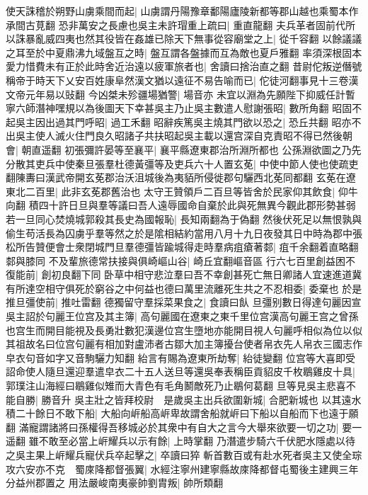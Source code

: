 使天誅稽於朔野山虜乘間而起|{
	山虜謂丹陽豫章鄱陽廬陵新都等郡山越也乘蜀本作承間古莧翻}
恐非萬安之長慮也吳主未許瑁重上疏曰|{
	重直龍翻}
夫兵革者固前代所以誅暴亂威四夷也然其役皆在姦雄已除天下無事從容廟堂之上|{
	從千容翻}
以餘議議之耳至於中夏鼎沸九域盤互之時|{
	盤互謂各盤據而互為敵也夏戶雅翻}
率須深根固本愛力惜費未有正於此時舍近治遠以疲軍旅者也|{
	舍讀曰捨治直之翻}
昔尉佗叛逆僭號稱帝于時天下乂安百姓康阜然漢文猶以遠征不易告喻而已|{
	佗徒河翻事見十三卷漢文帝元年易以䜴翻}
今凶桀未殄疆場猶警|{
	場音亦}
未宜以淵為先願陛下抑威任計暫寧六師潛神嘿規以為後圖天下幸甚吳主乃止吳主數遣人慰謝張昭|{
	數所角翻}
昭固不起吳主因出過其門呼昭|{
	過工禾翻}
昭辭疾篤吳主燒其門欲以恐之|{
	恐丘共翻}
昭亦不出吳主使人滅火住門良久昭諸子共扶昭起吳主載以還宫深自克責昭不得已然後朝會|{
	朝直遥翻}
初張彌許晏等至襄平|{
	襄平縣遼東郡治所淵所都也}
公孫淵欲圖之乃先分散其吏兵中使秦旦張羣杜德黃彊等及吏兵六十人置玄莬|{
	中使中節人使也使疏吏翻陳夀曰漢武帝開玄莬郡治沃沮城後為夷貊所侵徙郡句驪西北莬同都翻}
玄莬在遼東北二百里|{
	此非玄莬郡舊治也}
太守王贊領戶二百旦等皆舍於民家仰其飲食|{
	仰牛向翻}
積四十許日旦與羣等議曰吾人遠辱國命自棄於此與死無異今觀此郡形勢甚弱若一旦同心焚燒城郭殺其長史為國報恥|{
	長知兩翻為于偽翻}
然後伏死足以無恨孰與偷生苟活長為囚虜乎羣等然之於是隂相結約當用八月十九日夜發其日中時為郡中張松所告贊便會士衆閉城門旦羣德彊皆踰城得走時羣病疽瘡著䣛|{
	疽千余翻着直略翻䣛與膝同}
不及輩旅德常扶接與俱崎嶇山谷|{
	崎丘宜翻嶇音區}
行六七百里創益困不復能前|{
	創初良翻下同}
卧草中相守悲泣羣曰吾不幸創甚死亡無日卿諸人宜速進道冀有所達空相守俱死於窮谷之中何益也德曰萬里流離死生共之不忍相委|{
	委棄也}
於是推旦彊使前|{
	推吐雷翻}
德獨留守羣採菜果食之|{
	食讀曰飤}
旦彊别數日得達句麗因宣吳主詔於句麗王位宫及其主簿|{
	高句麗國在遼東之東千里位宫漢高句麗王宫之曾孫也宫生而開目能視及長勇壯數犯漢邊位宫生墮地亦能開目視人句麗呼相似為位以似其祖故名曰位宫句麗有相加對盧沛者古鄒大加主簿擾台使者帛衣先人帛衣三國志作皁衣句音如字又音駒驪力知翻}
紿言有賜為遼東所劫奪|{
	紿徒變翻}
位宫等大喜即受詔命使人隨旦還迎羣遣皁衣二十五人送旦等還吳奉表稱臣貢貂皮千枚鶡雞皮十具|{
	郭璞注山海經曰鶡雞似雉而大青色有毛角鬭敵死乃止鶡何葛翻}
旦等見吳主悲喜不能自勝|{
	勝音升}
吳主壯之皆拜校尉　是歲吳主出兵欲圍新城|{
	合肥新城也}
以其遠水積二十餘日不敢下船|{
	大船向㟁船高㟁卑故謂舍船就㟁曰下船以自船而下也遠于願翻}
滿寵謂諸將曰孫權得吾移城必於其衆中有自大之言今大舉來欲要一切之功|{
	要一遥翻}
雖不敢至必當上㟁耀兵以示有餘|{
	上時掌翻}
乃潛遣步騎六千伏肥水隱處以待之吳主果上㟁耀兵寵伏兵卒起擊之|{
	卒讀曰猝}
斬首數百或有赴水死者吳主又使全琮攻六安亦不克　蜀庲降都督張翼|{
	水經注寧州建寧縣故庲降都督屯蜀後主建興三年分益州郡置之}
用法嚴峻南夷豪帥劉胄叛|{
	帥所類翻}
